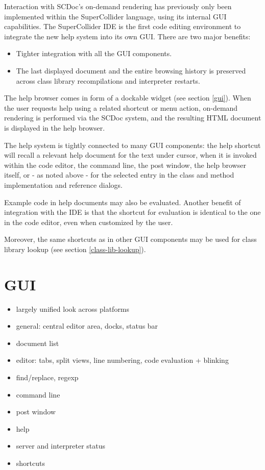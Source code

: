 \documentclass[11pt,a4paper]{article}
\begin{document}
Interaction with SCDoc's on-demand rendering has previously only been implemented within the SuperCollider language,
using its internal GUI capabilities. The SuperCollider IDE is the first code editing environment to integrate the new
help system into its own GUI. There are two major benefits:
\begin{itemize}
 \item Tighter integration with all the GUI components.
 \item The last displayed document and the entire browsing history is preserved across class library recompilations and
interpreter restarts.
\end{itemize}

The help browser comes in form of a dockable widget (see section \ref{gui}). When the user requests help using a related
shortcut or menu action, on-demand rendering is performed via the SCDoc system, and the resulting HTML document is
displayed in the help browser.

The help system is tightly connected to many GUI components: the help shortcut will recall a relevant help document
for the text under cursor, when it is invoked within the code editor, the command line, the post window, the help
browser itself, or - as noted above - for the selected entry in the class and method implementation and reference
dialogs.

Example code in help documents may also be evaluated. Another benefit of integration with the IDE is that the shortcut
for evaluation is identical to the one in the code editor, even when customized by the user.

Moreover, the same shortcuts as in other GUI components may be used for class library lookup (see section
\ref{class-lib-lookup}).

\section{GUI}

\begin{itemize}
 \item largely unified look across platforms
 \item general: central editor area, docks, status bar
 \item document list
 \item editor: tabs, split views, line numbering, code evaluation + blinking
 \item find/replace, regexp
 \item command line
 \item post window
 \item help
 \item server and interpreter status
 \item shortcuts
\end{itemize}
\end{document}
